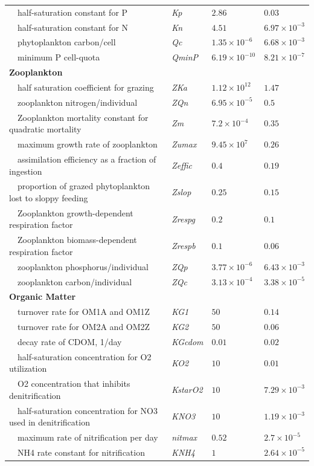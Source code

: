 \documentclass[review]{elsarticle}\usepackage[]{graphicx}\usepackage[]{color}
\begin{document}
\begin{table}[!tbp]
{\begin{center}
\begin{tabular}{llll}
~~half-saturation constant for P&\textit{Kp}&$2.86$&$0.03$\tabularnewline
~~half-saturation constant for N&\textit{Kn}&$4.51$&$6.97\times 10^{-3}$\tabularnewline
~~phytoplankton carbon/cell&\textit{Qc}&$1.35\times 10^{-6}$&$6.68\times 10^{-3}$\tabularnewline
~~minimum P cell-quota&\textit{QminP}&$6.19\times 10^{-10}$&$8.21\times 10^{-7}$\tabularnewline
\hline
{\bfseries Zooplankton}&&&\tabularnewline
~~half saturation coefficient for grazing&\textit{ZKa}&$1.12\times 10^{12}$&$1.47$\tabularnewline
~~zooplankton nitrogen/individual&\textit{ZQn}&$6.95\times 10^{-5}$&$0.5$\tabularnewline
~~Zooplankton mortality constant for quadratic mortality&\textit{Zm}&$7.2\times 10^{-4}$&$0.35$\tabularnewline
~~maximum growth rate of zooplankton&\textit{Zumax}&$9.45\times 10^{7}$&$0.26$\tabularnewline
~~assimilation efficiency as a fraction of ingestion&\textit{Zeffic}&$0.4$&$0.19$\tabularnewline
~~proportion of grazed phytoplankton lost to sloppy feeding&\textit{Zslop}&$0.25$&$0.15$\tabularnewline
~~Zooplankton growth-dependent respiration factor&\textit{Zrespg}&$0.2$&$0.1$\tabularnewline
~~Zooplankton biomass-dependent respiration factor&\textit{Zrespb}&$0.1$&$0.06$\tabularnewline
~~zooplankton phosphorus/individual&\textit{ZQp}&$3.77\times 10^{-6}$&$6.43\times 10^{-3}$\tabularnewline
~~zooplankton carbon/individual&\textit{ZQc}&$3.13\times 10^{-4}$&$3.38\times 10^{-5}$\tabularnewline
\hline
{\bfseries Organic Matter}&&&\tabularnewline
~~turnover rate for OM1A and OM1Z&\textit{KG1}&$50$&$0.14$\tabularnewline
~~turnover rate for OM2A and OM2Z&\textit{KG2}&$50$&$0.06$\tabularnewline
~~decay rate of CDOM, 1/day&\textit{KGcdom}&$0.01$&$0.02$\tabularnewline
~~half-saturation concentration for O2 utilization&\textit{KO2}&$10$&$0.01$\tabularnewline
~~O2 concentration that inhibits denitrification&\textit{KstarO2}&$10$&$7.29\times 10^{-3}$\tabularnewline
~~half-saturation concentration for NO3 used in denitrification&\textit{KNO3}&$10$&$1.19\times 10^{-3}$\tabularnewline
~~maximum rate of nitrification per day&\textit{nitmax}&$0.52$&$2.7\times 10^{-5}$\tabularnewline
~~NH4 rate constant for nitrification&\textit{KNH4}&$1$&$2.64\times 10^{-5}$\tabularnewline
\hline
\end{tabular}\end{center}}
\end{table}


\clearpage

\end{document}
